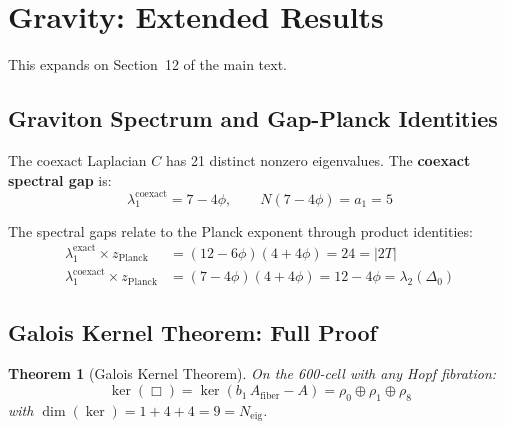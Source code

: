 \documentclass[12pt,a4paper]{article}
\newtheorem{theorem}{Theorem}
\theoremstyle{definition}
\begin{document}
\section{Gravity: Extended Results}
\label{sec:S-gravity}

This expands on Section~12 of the main text.

\subsection{Graviton Spectrum and Gap-Planck Identities}

The coexact Laplacian $C$ has 21 distinct nonzero eigenvalues.  The \textbf{coexact spectral gap} is:
\begin{equation}
\lambda_1^{\text{coexact}} = 7 - 4\phi, \qquad N(7-4\phi) = a_1 = 5
\end{equation}

The spectral gaps relate to the Planck exponent through product identities:
\begin{align}
\lambda_1^{\text{exact}} \times z_{\text{Planck}} &= (12 - 6\phi)(4 + 4\phi) = 24 = |2T| \\
\lambda_1^{\text{coexact}} \times z_{\text{Planck}} &= (7 - 4\phi)(4 + 4\phi) = 12 - 4\phi = \lambda_2(\Delta_0)
\end{align}

\subsection{Galois Kernel Theorem: Full Proof}

\begin{theorem}[Galois Kernel Theorem]\label{thm:S-galois-kernel}
On the 600-cell with any Hopf fibration:
\begin{equation}
\ker(\Box) = \ker(b_1\,A_{\mathrm{fiber}} - A) = \rho_0 \oplus \rho_1 \oplus \rho_8
\end{equation}
with $\dim(\ker) = 1 + 4 + 4 = 9 = N_{\mathrm{eig}}$.
\end{theorem}
\end{document}
